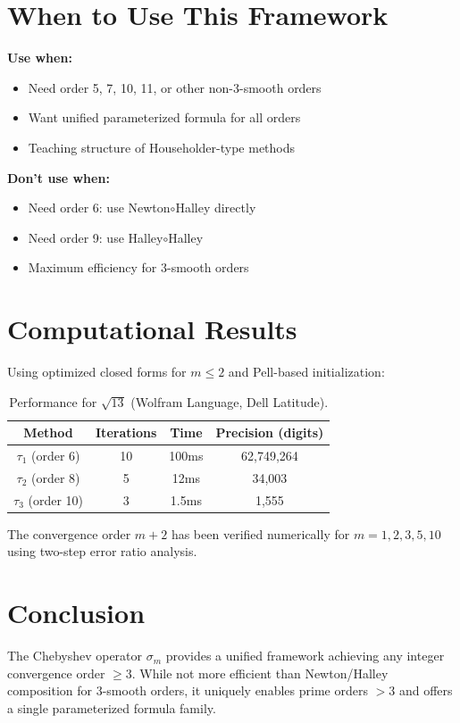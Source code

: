 \documentclass[11pt]{article}
\theoremstyle{definition}
\theoremstyle{remark}
\begin{document}
\section{When to Use This Framework}

\textbf{Use when:}
\begin{itemize}
\item Need order 5, 7, 10, 11, or other non-3-smooth orders
\item Want unified parameterized formula for all orders
\item Teaching structure of Householder-type methods
\end{itemize}

\textbf{Don't use when:}
\begin{itemize}
\item Need order 6: use Newton$\circ$Halley directly
\item Need order 9: use Halley$\circ$Halley
\item Maximum efficiency for 3-smooth orders
\end{itemize}

\section{Computational Results}

Using optimized closed forms for $m \leq 2$ and Pell-based initialization:

\begin{table}[h]
\centering
\begin{tabular}{c|c|c|c}
Method & Iterations & Time & Precision (digits) \\ \hline
$\tau_1$ (order 6) & 10 & 100ms & 62,749,264 \\
$\tau_2$ (order 8) & 5 & 12ms & 34,003 \\
$\tau_3$ (order 10) & 3 & 1.5ms & 1,555 \\
\end{tabular}
\caption{Performance for $\sqrt{13}$ (Wolfram Language, Dell Latitude).}
\end{table}

The convergence order $m+2$ has been verified numerically for $m = 1, 2, 3, 5, 10$
using two-step error ratio analysis.

\section{Conclusion}

The Chebyshev operator $\sigma_m$ provides a unified framework achieving any
integer convergence order $\geq 3$. While not more efficient than Newton/Halley
composition for 3-smooth orders, it uniquely enables prime orders $> 3$ and
offers a single parameterized formula family.



\end{document}
